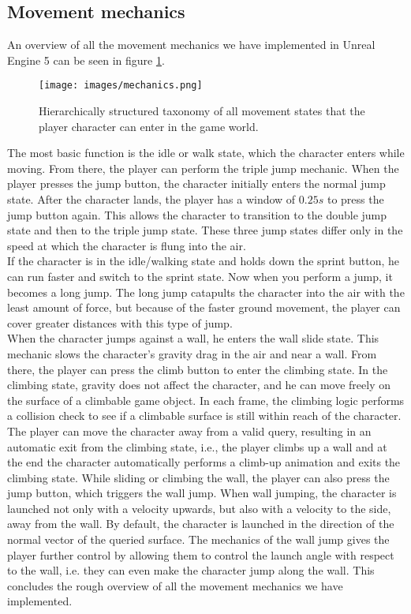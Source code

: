 \documentclass[conference]{IEEEtran}
\begin{document}
\subsection{Movement mechanics}

An overview of all the movement mechanics we have implemented in Unreal Engine 5 can be seen in figure \ref{fig:mechanics}.

\begin{figure}[!ht]
    \centering
    \texttt{[image: images/mechanics.png]} %
    \caption{Hierarchically structured taxonomy of all movement states that the player character can enter in the game world.}
    \label{fig:mechanics}
\end{figure}

The most basic function is the idle or walk state, which the character enters while moving.
From there, the player can perform the triple jump mechanic.
When the player presses the jump button, the character initially enters the normal jump state. 
After the character lands, the player has a window of $\textit{0.25s}$ to press the jump button again.
This allows the character to transition to the double jump state and then to the triple jump state.
These three jump states differ only in the speed at which the character is flung into the air. \\
If the character is in the idle/walking state and holds down the sprint button, he can run faster and switch to the sprint state.
Now when you perform a jump, it becomes a long jump.
The long jump catapults the character into the air with the least amount of force, but because of the faster ground movement, the player can cover greater distances with this type of jump. \\
When the character jumps against a wall, he enters the wall slide state. 
This mechanic slows the character's gravity drag in the air and near a wall.
From there, the player can press the climb button to enter the climbing state.
In the climbing state, gravity does not affect the character, and he can move freely on the surface of a climbable game object.
In each frame, the climbing logic performs a collision check to see if a climbable surface is still within reach of the character.
The player can move the character away from a valid query, resulting in an automatic exit from the climbing state, i.e., the player climbs up a wall and at the end the character automatically performs a climb-up animation and exits the climbing state.
While sliding or climbing the wall, the player can also press the jump button, which triggers the wall jump.
When wall jumping, the character is launched not only with a velocity upwards, but also with a velocity to the side, away from the wall.
By default, the character is launched in the direction of the normal vector of the queried surface.
The mechanics of the wall jump gives the player further control by allowing them to control the launch angle with respect to the wall, i.e. they can even make the character jump along the wall.
This concludes the rough overview of all the movement mechanics we have implemented.
\end{document}
